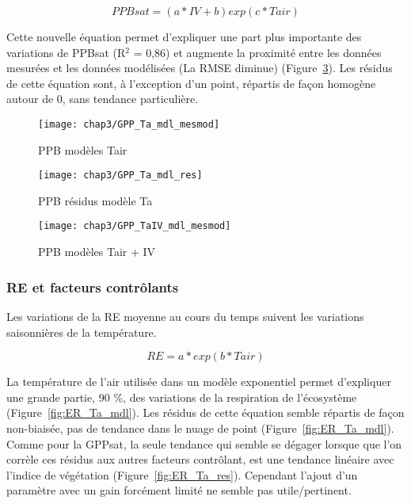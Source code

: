 \begin{equation}
PPBsat = (a * IV + b)exp(c*Tair)
\end{equation}

Cette nouvelle équation permet d'expliquer une part plus importante des variations de PPBsat (R$^{2}$ = 0,86) et augmente la proximité entre les données mesurées et les données modélisées (La RMSE diminue) (Figure~\ref{fig:PPB_TaIV_mdl}).
Les résidus de cette équation sont, à l'exception d'un point, répartis de façon homogène autour de 0, sans tendance particulière.


\begin{figure}
\centering
\texttt{[image: chap3/GPP\_Ta\_mdl\_mesmod]}
\caption{PPB modèles Tair}
\label{fig:PPB_Ta_mdl}
\end{figure}

\begin{figure}
\centering
\texttt{[image: chap3/GPP\_Ta\_mdl\_res]}
\caption{PPB résidus modèle Ta}
\label{fig:PPB_Ta_res}
\end{figure}

\begin{figure}
\centering
\texttt{[image: chap3/GPP\_TaIV\_mdl\_mesmod]}
\caption{PPB modèles Tair + IV}
\label{fig:PPB_TaIV_mdl}
\end{figure}

\subsubsection{RE et facteurs contrôlants}

Les variations de la RE moyenne au cours du temps suivent les variations saisonnières de la température.

\begin{equation}
RE = a*exp(b*Tair)
\end{equation}

La température de l'air utilisée dans un modèle exponentiel permet d'expliquer une grande partie, 90 \%, des variations de la respiration de l'écosystème (Figure~\ref{fig:ER_Ta_mdl}).
Les résidus de cette équation semble répartis de façon non-biaisée, pas de tendance dans le nuage de point (Figure~\ref{fig:ER_Ta_mdl}). 
Comme pour la GPPsat, la seule tendance qui semble se dégager lorsque que l'on corrèle ces résidus aux autres facteurs contrôlant, est une tendance linéaire avec l'indice de végétation (Figure~\ref{fig:ER_Ta_res}).
Cependant l'ajout d'un paramètre avec un gain forcément limité ne semble pas utile/pertinent.

